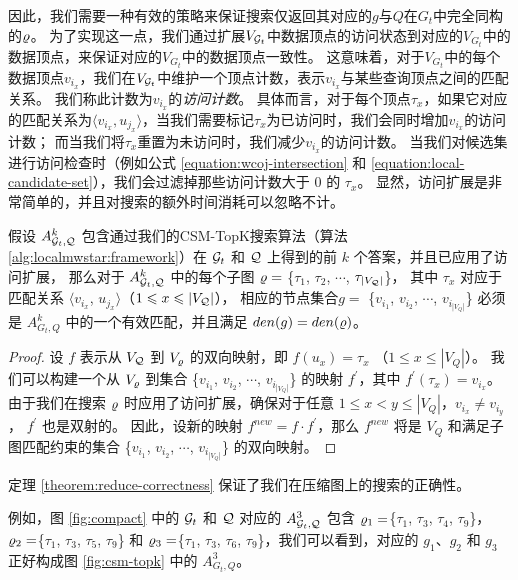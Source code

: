 因此，我们需要一种有效的策略来保证搜索仅返回其对应的$g$与$Q$在$G_t$中完全同构的$\varrho$。
为了实现这一点，我们通过扩展$V_{\mathcal{G}_t}$中数据顶点的访问状态到对应的$V_{G_t}$中的数据顶点，来保证对应的$V_{G_t}$中的数据顶点一致性。
这意味着，对于$V_{G_t}$中的每个数据顶点$v_{i_x}$，我们在$V_{\mathcal{G}_t}$中维护一个顶点计数，表示$v_{i_x}$与某些查询顶点之间的匹配关系。
我们称此计数为$v_{i_x}$的\emph{访问计数}。
具体而言，对于每个顶点$\tau_x$，如果它对应的匹配关系为$\langle v_{i_x}, u_{j_x} \rangle$，当我们需要标记$\tau_x$为已访问时，我们会同时增加$v_{i_x}$的访问计数；
而当我们将$\tau_x$重置为未访问时，我们减少$v_{i_x}$的访问计数。
当我们对候选集进行访问检查时（例如公式 \ref{equation:wcoj-intersection} 和 \ref{equation:local-candidate-set}），我们会过滤掉那些访问计数大于 0 的 $\tau_x$。
显然，访问扩展是非常简单的，并且对搜索的额外时间消耗可以忽略不计。
\begin{theorem} \label{theorem:reduce-correctness}
假设 $A_{\mathcal{G}_t, \mathcal{Q}}^k$ 包含通过我们的CSM-TopK搜索算法（算法 \ref{alg:localmwstar:framework}）在 $\mathcal{G}_t$ 和 $\mathcal{Q}$ 上得到的前 $k$ 个答案，并且已应用了访问扩展，
那么对于 $A_{\mathcal{G}_t, \mathcal{Q}}^k$ 中的每个子图 $\varrho=$ \{$\tau_1$, $\tau_2$, $\cdots$, $\tau_{|V_{\mathcal{Q}}|}$\}，
其中 $\tau_{x}$ 对应于匹配关系 $\langle v_{i_x}$, $u_{j_x}\rangle$（$1\leqslant x\leqslant |V_{\mathcal{Q}}|$），
相应的节点集合$g=$ \{$v_{i_1}$, $v_{i_2}$, $\cdots$, $v_{i_{|V_Q|}}$\} 必须是 $A_{G_t, Q}^k$ 中的一个有效匹配，并且满足 $den(g) = den(\varrho)$。
\end{theorem}
\begin{proof}%
设 $f$ 表示从 $V_{\mathcal{Q}}$ 到 $V_{\varrho}$ 的双向映射，即 $f(u_x) = \tau_x$ （$1\leq x\leq |V_Q|$）。
我们可以构建一个从 $V_{\varrho}$ 到集合 \{$v_{i_1}$, $v_{i_2}$, $\cdots$, $v_{i_{|V_Q|}}$\} 的映射 $f^{\prime}$，其中 $f^{\prime}(\tau_x) = v_{i_x}$。
由于我们在搜索 $\varrho$ 时应用了访问扩展，确保对于任意 $1\leq x<y\leq |V_Q|$，$v_{i_x} \neq v_{i_y}$， $f^{\prime}$ 也是双射的。
因此，设新的映射 $f^{new} = f \cdot f^\prime$，那么 $f^{new}$ 将是 $V_Q$ 和满足子图匹配约束的集合 \{$v_{i_1}$, $v_{i_2}$, $\cdots$, $v_{i_{|V_Q|}}$\} 的双向映射。
\end{proof}
定理 \ref{theorem:reduce-correctness} 保证了我们在压缩图上的搜索的正确性。

例如，图 \ref{fig:compact} 中的 $\mathcal{G}_t$ 和 $\mathcal{Q}$ 对应的 $A_{\mathcal{G}_t, \mathcal{Q}}^3$ 包含 $\varrho_1=$\{$\tau_1$, $\tau_3$, $\tau_4$, $\tau_9$\}，$\varrho_2=$\{$\tau_1$, $\tau_3$, $\tau_5$, $\tau_9$\} 和 $\varrho_3=$\{$\tau_1$, $\tau_3$, $\tau_6$, $\tau_9$\}，我们可以看到，对应的 $g_1$、$g_2$ 和 $g_3$ 正好构成图 \ref{fig:csm-topk} 中的 $A_{G_t, Q}^3$。


